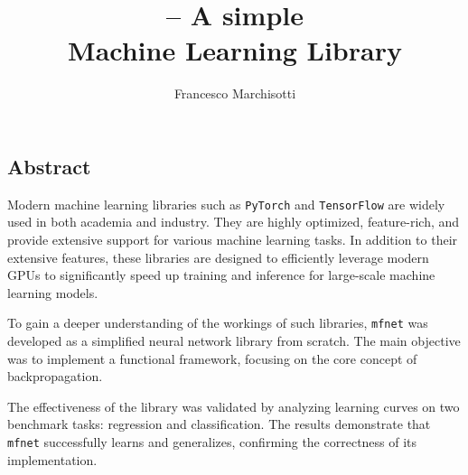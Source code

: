 \documentclass{unitothesis}
\author{Francesco Marchisotti}
\title{\centering\mfnet \sc-- A simple\\[0.5em] Machine Learning Library}
\newcommand{\mono}[1]{\texttt{#1}}
\newcommand{\mfnet}{\mono{mfnet}\xspace}
\newcommand{\pytorch}{\mono{PyTorch}\xspace}
\begin{document}
\maketitlepage
\thispagestyle{empty}
\subsection*{\centering Abstract}
Modern machine learning libraries such as \pytorch and \mono{TensorFlow} are widely used in both academia and industry. They are highly optimized, feature-rich, and provide extensive support for various machine learning tasks. In addition to their extensive features, these libraries are designed to efficiently leverage modern GPUs to significantly speed up training and inference for large-scale machine learning models.

To gain a deeper understanding of the workings of such libraries, \mfnet was developed as a simplified neural network library from scratch. The main objective was to implement a functional framework, focusing on the core concept of backpropagation.

The effectiveness of the library was validated by analyzing learning curves on two benchmark tasks: regression and classification. The results demonstrate that \mfnet successfully learns and generalizes, confirming the correctness of its implementation.

\newpage

{\hypersetup{linkcolor=black}\tableofcontents}





\appendix


\end{document}
